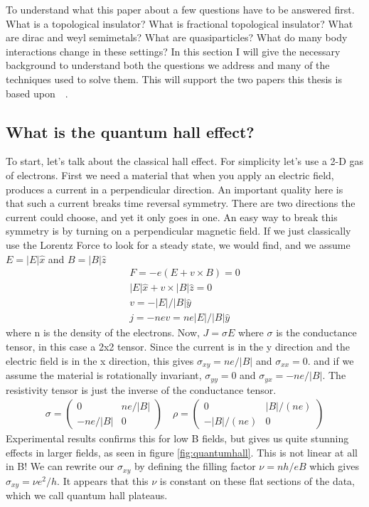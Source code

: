 To understand what this paper about a few questions have to be answered first. What is a topological insulator? What is fractional topological insulator? What are dirac and weyl semimetals? What are quasiparticles? What do many body interactions change in these settings? In this section I will give the necessary background to understand both the questions we address and many of the techniques used to solve them. This will support the two papers this thesis is based upon~\cite{SahooSirotaGilTeo17}~\cite{RazaSirotaTeo17}.

\subsection{What is the quantum hall effect?}

To start, let's talk about the classical hall effect. For simplicity let's use a 2-D gas of electrons. First we need a material that when you apply an electric field, produces a current in a perpendicular direction. An important quality here is that such a current breaks time reversal symmetry. There are two directions the current could choose, and yet it only goes in one. An easy way to break this symmetry is by turning on a perpendicular magnetic field. If we just classically use the Lorentz Force to look for a steady state, we would find, and we assume $E=|E|\hat{x}$ and $B=|B|\hat{z}$
\begin{align}
F = -e(E+v \times B) = 0 \\
|E|\hat{x} + v \times |B| \hat{z} =0 \\
v = -|E|/|B| \hat{y}\\
j = -nev = ne|E|/|B| \hat{y}
\end{align}
where n is the density of the electrons. Now, $J= \sigma E$ where $\sigma$ is the conductance tensor, in this case a 2x2 tensor. Since the current is in the y direction and the electric field is in the x direction, this gives $\sigma_{xy}= ne/|B| $ and $\sigma_{xx}= 0 $. and if we assume the material is rotationally invariant, $\sigma_{yy}= 0 $ and $\sigma_{yx}= -ne/|B| $. The resistivity tensor is just the inverse of the conductance tensor.
\begin{align}
\sigma = 
\begin{pmatrix}
0 & ne/|B| \\
-ne/|B| & 0
\end{pmatrix} \quad 
\rho = 
\begin{pmatrix}
0 & |B|/(ne) \\
-|B|/(ne) & 0
\end{pmatrix}
\end{align}
Experimental results confirms this for low B fields, but gives us quite stunning effects in larger fields, as seen in figure \ref{fig:quantumhall}. This is not linear at all in B! We can rewrite our $\sigma_{xy}$ by defining the filling factor $\nu=nh/eB$ which gives $\sigma_{xy} = \nu e^2/h$. It appears that this $\nu$ is constant on these flat sections of the data, which we call quantum hall plateaus. 

